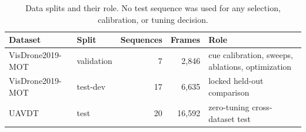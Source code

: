 \begin{table}[t]
\centering
\caption{Data splits and their role. No test sequence was used for any selection, calibration, or tuning decision.}
\label{tab:data}
\small
\begin{tabular}{llrrl}
\hline
Dataset & Split & Sequences & Frames & Role \\
\hline
VisDrone2019-MOT & validation & 7 & 2,846 & cue calibration, sweeps, ablations, optimization \\
VisDrone2019-MOT & test-dev & 17 & 6,635 & locked held-out comparison \\
UAVDT & test & 20 & 16,592 & zero-tuning cross-dataset test \\
\hline
\end{tabular}
\end{table}
